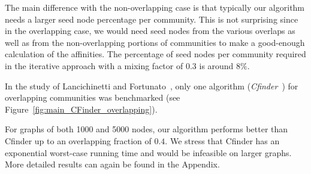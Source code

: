 The main difference with the non-overlapping case is that typically our algorithm needs a larger 
seed node percentage per community. This is not surprising since in the overlapping case, we would need seed nodes from the various overlaps as well as from the non-overlapping portions of communities to make a good-enough calculation of the affinities. The percentage of seed nodes per community required in the iterative approach with a mixing factor of $0.3$ is around 8$\%$.  

In the study of Lancichinetti and Fortunato~\cite{LF09}, 
only one algorithm (\emph{Cfinder}~\cite{PDFV05}) for overlapping communities was benchmarked 
(see Figure~\ref{fig:main_CFinder_overlapping}). 

For graphs of both 1000 and 5000 nodes, our algorithm performs better 
than Cfinder up to an overlapping fraction of $0.4$. We stress that Cfinder 
has an exponential worst-case running time and would be infeasible on larger graphs. More detailed results can again be found in the Appendix. 





